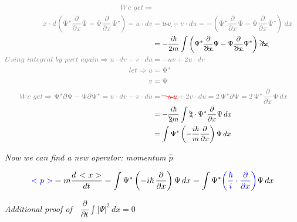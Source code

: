 \begin{align}
        \color{gray} We~get\Rightarrow\\
        \color{gray} x \cdot d \left( \Psi^*\dfrac{\partial}{\partial x}\Psi - \Psi \dfrac{\partial}{\partial x}\Psi^* \right)
        = u\cdot dv
        &\color{gray} = \bcancel{u\,v} - v\cdot du
        = - \left( \Psi^*\dfrac{\partial}{\partial x}\Psi - \Psi \dfrac{\partial}{\partial x}\Psi^* \right)\,dx\\
        &=  -\dfrac{i\hbar}{2m} \int \left( \Psi^*\dfrac{\partial}{\bcancel{\partial x}}\Psi - \Psi \dfrac{\partial}{\bcancel{\partial x}}\Psi^* \right) \,\bcancel{dx}\\
        \color{gray} Using~integral~by~part~again\Rightarrow u\cdot dv - v\cdot du
        &\color{gray} = - uv + 2u\cdot dv\\
        \color{gray} let\Rightarrow u 
        &\color{gray} = \Psi^*\\
        \color{gray} v
        &\color{gray} = \Psi\\
        \color{gray} We~get\Rightarrow
        \color{gray} \Psi^*\partial\Psi - \Psi \partial\Psi^*
        = u\cdot dv - v\cdot du
        &\color{gray} = {\color{red}\bcancel{-u\,v}} + 2v\cdot du
        = 2\,\Psi^* \partial\Psi
        = 2\,\Psi^* \dfrac{\partial}{\partial x}\Psi\,dx\\
        &= -\dfrac{i\hbar}{\bcancel{2}m} \int \bcancel{2}\cdot \Psi^* \dfrac{\partial}{\partial x}\Psi\,dx\\
        &= \int \Psi^* \left(-\dfrac{i\hbar}{m}\dfrac{\partial}{\partial x}\right)\Psi\,dx
    \end{align}

    \textit{Now we can find a new operator: momentum $\hat{p}$}
    
    \[
        {\color{blue}<p>} = m\dfrac{d\,<x>}{dt} = \int \Psi^* \left(-i\hbar\,\dfrac{\partial}{\partial x}\right)\Psi\,dx = \int \Psi^* {\color{blue}\left(\dfrac{\hbar}{i}\cdot\dfrac{\partial}{\partial x}\right)}\Psi\,dx
    \]
    
    \textit{Additional proof of~~$\dfrac{\partial}{\partial t}\int |\Psi|^2\,dx = 0$}

